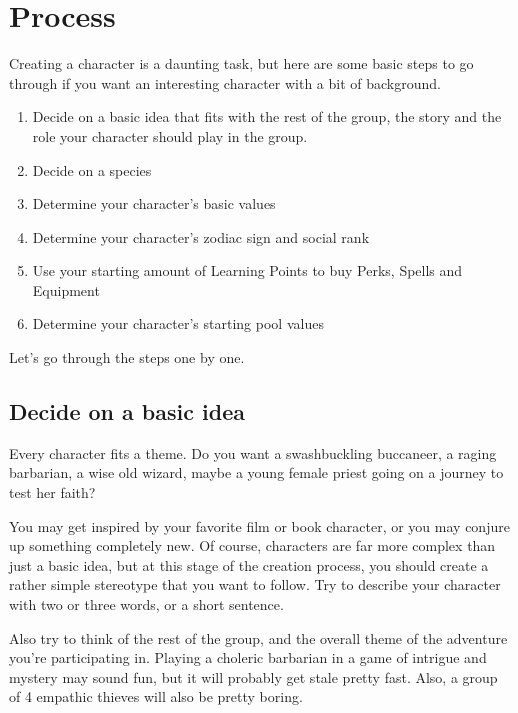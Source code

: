 \chapter{Process}\label{ch:charCreationProcess}
Creating a character is a daunting task, but here are some basic steps to go through if you want an interesting character with a bit of background.


\begin{enumerate}
	\item Decide on a basic idea that fits with the rest of the group, the story and the role your character should play in the group.

	\item Decide on a species

	\item Determine your character's basic values

	\item Determine your character's zodiac sign and social rank

	\item Use your starting amount of Learning Points to buy Perks, Spells and Equipment

	\item Determine your character's starting pool values
\end{enumerate}


Let's go through the steps one by one.


\section{Decide on a basic idea}\label{sec:charCreationIdea}

Every character fits a theme. 
Do you want a swashbuckling buccaneer, a raging barbarian, a wise old wizard, maybe a young female priest going on a journey to test her faith?

You may get inspired by your favorite film or book character, or you may conjure up something completely new.
Of course, characters are far more complex than just a basic idea, but at this stage of the creation process, you should create a rather simple stereotype that you want to follow.
Try to describe your character with two or three words, or a short sentence.

Also try to think of the rest of the group, and the overall theme of the adventure you're participating in.
Playing a choleric barbarian in a game of intrigue and mystery may sound fun, but it will probably get stale pretty fast.
Also, a group of 4 empathic thieves will also be pretty boring.

